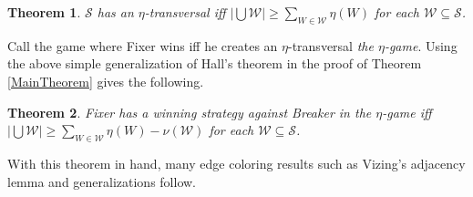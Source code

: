 \documentclass[12pt]{amsart}
\theoremstyle{plain}
\newtheorem{thm}{Theorem}[section]
\theoremstyle{definition}
\theoremstyle{remark}
\newcommand{\fancy}[1]{\mathcal{#1}}
\newcommand{\card}[1]{\left|#1\right|}
\renewcommand{\S}{\fancy{S}}
\newcommand{\W}{\fancy{W}}
\begin{document}
\begin{thm}
$\S$ has an $\eta$-transversal iff $\card{\bigcup \W} \geq \sum_{W \in \W}
\eta(W)$ for each $\W \subseteq \S$.
\end{thm}

Call the game where Fixer wins iff he creates an $\eta$-transversal \emph{the
$\eta$-game}.  Using the above simple generalization of Hall's theorem in the
proof of Theorem \ref{MainTheorem} gives the following.

\begin{thm}\label{MainTheoremMulti}
Fixer has a winning strategy against Breaker in the $\eta$-game iff
$\card{\bigcup \W} \geq \sum_{W \in \W}
\eta(W) - \nu(\W)$ for each $\W \subseteq \S$.
\end{thm}

With this theorem in hand, many edge coloring results such as Vizing's adjacency
lemma and generalizations follow.



%
%
\end{document}

